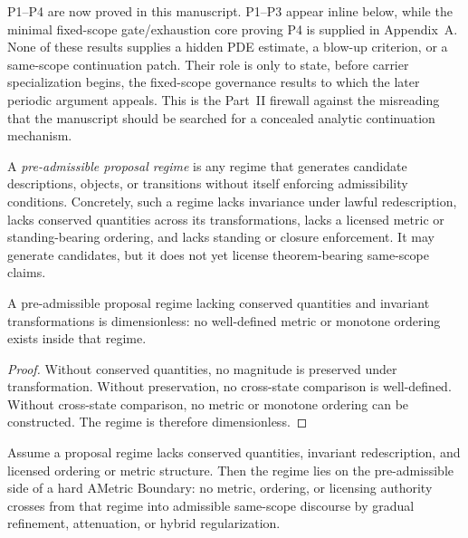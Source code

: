 \begin{tcolorbox}[title={What this packet is and is not}, colback=blue!2!white, colframe=blue!55!black]
P1--P4 are now proved in this manuscript. P1--P3 appear inline below, while the minimal fixed-scope gate/exhaustion core proving P4 is supplied in Appendix~A. None of these results supplies a hidden PDE estimate, a blow-up criterion, or a same-scope continuation patch. Their role is only to state, before carrier specialization begins, the fixed-scope governance results to which the later periodic argument appeals. This is the Part~II firewall against the misreading that the manuscript should be searched for a concealed analytic continuation mechanism.
\end{tcolorbox}

\begin{definition}\label{def:preadmissible-proposal-regime}
A \emph{pre-admissible proposal regime} is any regime that generates candidate descriptions, objects, or transitions without itself enforcing admissibility conditions. Concretely, such a regime lacks invariance under lawful redescription, lacks conserved quantities across its transformations, lacks a licensed metric or standing-bearing ordering, and lacks standing or closure enforcement. It may generate candidates, but it does not yet license theorem-bearing same-scope claims.
\end{definition}

\begin{lemma}\label{lem:dimensionlessness-preadmissible}
A pre-admissible proposal regime lacking conserved quantities and invariant transformations is dimensionless: no well-defined metric or monotone ordering exists inside that regime.
\end{lemma}

\begin{proof}
Without conserved quantities, no magnitude is preserved under transformation. Without preservation, no cross-state comparison is well-defined. Without cross-state comparison, no metric or monotone ordering can be constructed. The regime is therefore dimensionless.
\end{proof}

\begin{manualtheorem}
\label{thm:imported-ametric-boundary}
Assume a proposal regime lacks conserved quantities, invariant redescription, and licensed ordering or metric structure. Then the regime lies on the pre-admissible side of a hard AMetric Boundary: no metric, ordering, or licensing authority crosses from that regime into admissible same-scope discourse by gradual refinement, attenuation, or hybrid regularization.
\end{manualtheorem}

